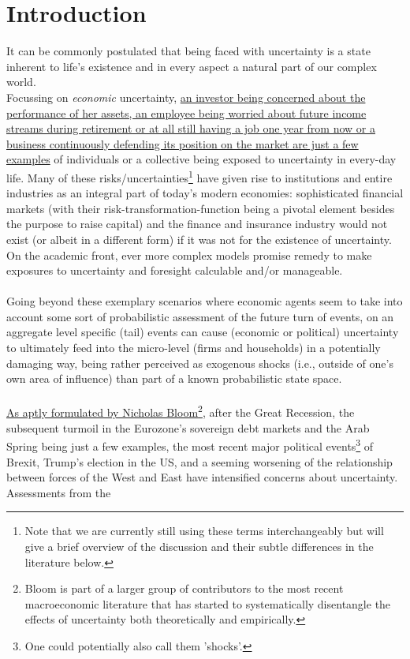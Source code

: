 \documentclass[a4paper,11pt,listof=nochaptergap,oneside,pointednumbers,bibtotoc,bigheadings,liststotoc]{scrbook}
\theoremstyle{mysatz}
\theoremstyle{mydefinition}
\theoremstyle{mybemerkung}
\begin{document}
\chapter{Introduction}
It can be commonly postulated that being faced with uncertainty is a state inherent to life's existence and in every aspect a natural part of our complex world. \\
Focussing on \textit{economic} uncertainty, \href{http://citeseerx.ist.psu.edu/viewdoc/download?doi=10.1.1.334.4248&rep=rep1&type=pdf}{an investor being concerned about the performance of her assets, an employee being worried about future income streams during retirement or at all still having a job one year from now or a business continuously defending its position on the market are just a few examples} of individuals or a collective being exposed to uncertainty in every-day life. Many of these risks/uncertainties\footnote{Note that we are currently still using these terms interchangeably but will give a brief overview of the discussion and their subtle differences in the literature below.} have given rise to institutions and entire industries as an integral part of today's modern economies: sophisticated financial markets (with their risk-transformation-function being a pivotal element besides the purpose to raise capital) and the finance and insurance industry would not exist (or albeit in a different form) if it was not for the existence of uncertainty. On the academic front, ever more complex models promise remedy to make exposures to uncertainty and foresight calculable and/or manageable.\\
\\
Going beyond these exemplary scenarios where economic agents seem to take into account some sort of probabilistic assessment of the future turn of events, on an aggregate level specific (tail) events can cause (economic or political) uncertainty to ultimately feed into the micro-level (firms and households) in a potentially damaging way, being rather perceived as exogenous shocks (i.e., outside of one's own area of influence) than part of a known probabilistic state space.\\
\\
\href{https://site.stanford.edu/2018/session-6}{As aptly formulated by Nicholas Bloom}\footnote{Bloom is part of a larger group of contributors to the most recent macroeconomic literature that has started to systematically disentangle the effects of uncertainty both theoretically and empirically.}, after the Great Recession, the subsequent turmoil in the Eurozone's sovereign debt markets and the Arab Spring being just a few examples, the most recent major political events\footnote{One could potentially also call them 'shocks'.} of Brexit, Trump's election in the US,  and a seeming worsening of the relationship between forces of the West and East have intensified concerns about uncertainty. Assessments from the 
\end{document}
